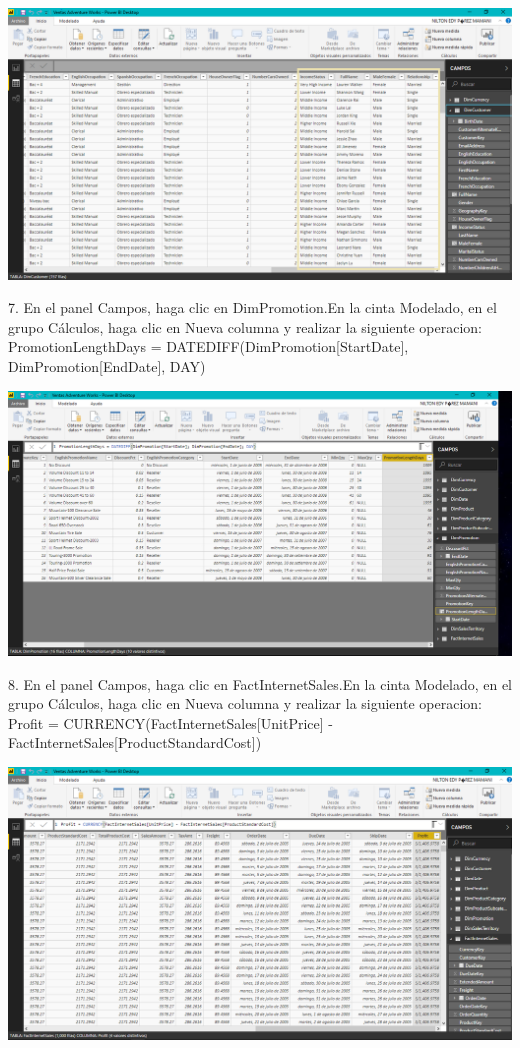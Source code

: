 \begin{center}
\includegraphics[width=15cm]{./Imagenes/img6} 
\end{center}

\begin{itemize}
7. En el panel Campos, haga clic en DimPromotion.En la cinta Modelado, en el grupo Cálculos, haga clic en Nueva columna y realizar la siguiente operacion:
PromotionLengthDays = DATEDIFF(DimPromotion[StartDate], DimPromotion[EndDate], DAY)


\end{itemize}

\begin{center}
\includegraphics[width=15cm]{./Imagenes/img7} 
\end{center}


\begin{itemize}
8. En el panel Campos, haga clic en FactInternetSales.En la cinta Modelado, en el grupo Cálculos, haga clic en Nueva columna y realizar la siguiente operacion:
Profit = CURRENCY(FactInternetSales[UnitPrice] -
FactInternetSales[ProductStandardCost])
\end{itemize}

\begin{center}
\includegraphics[width=15cm]{./Imagenes/img8} 
\end{center}